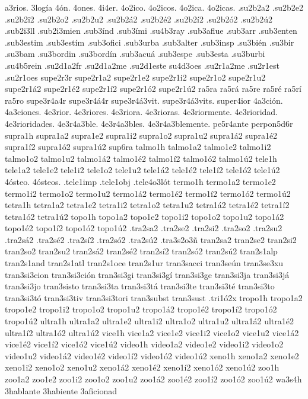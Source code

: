 {a3rios.
3logía
4ón.
4ones.
4i4er.
4o2ico.
4o2icos.
4o2ica.
4o2icas.
.su2b2a2
.su2b2e2
.su2b2i2
.su2b2o2
.su2b2u2
.su2b2á2
.su2b2é2
.su2b2í2
.su2b2ó2
.su2b2ú2
.sub2i3ll
.sub2i3mien
.sub3índ
.sub3ími
.su4b3ray
.sub3aflue
.sub3arr
.sub3enten
.sub3estim
.sub3estím
.sub3ofici
.sub3urba
.sub3alter
.sub3insp
.su3bién
.su3bir
.su3bam
.su3bordin
.su3bordín
.sub3acuá
.sub3espe
.sub3esta
.su3burbi
.su4b5rein
.su2d1a2fr
.su2d1a2me
.su2d1este
su4d3oes
.su2r1a2me
.su2r1est
.su2r1oes
supe2r3r
supe2r1a2 supe2r1e2 supe2r1i2 supe2r1o2 supe2r1u2
supe2r1á2 supe2r1é2 supe2r1í2 supe2r1ó2 supe2r1ú2
ra5ra
ra5rá
ra5re
ra5ré
ra5rí
ra5ro
supe3r4a4r
supe3r4á4r
supe3r4á3vit.
supe3r4á3vits.
super4ior
4a3ción.
4a3ciones.
4e3rior.
4e3riores.
4e3riora.
4e3rioras.
4e3riormente.
4e3rioridad.
4e3rioridades.
4e3r4a3ble.
4e3r4a3bles.
4e3r4a3blemente.
pe5r4ante
perpon5d6r
supra1h
supra1a2 supra1e2 supra1i2 supra1o2 supra1u2
supra1á2 supra1é2 supra1í2 supra1ó2 supra1ú2
sup6ra
talmo1h
talmo1a2 talmo1e2 talmo1i2 talmo1o2 talmo1u2
talmo1á2 talmo1é2 talmo1í2 talmo1ó2 talmo1ú2
tele1h
tele1a2 tele1e2 tele1i2 tele1o2 tele1u2
tele1á2 tele1é2 tele1í2 tele1ó2 tele1ú2
4ósteo.
4ósteos.
.tele1imp
.tele1obj
.tele4o3lót
termo1h
termo1a2 termo1e2 termo1i2 termo1o2 termo1u2
termo1á2 termo1é2 termo1í2 termo1ó2 termo1ú2
tetra1h
tetra1a2 tetra1e2 tetra1i2 tetra1o2 tetra1u2
tetra1á2 tetra1é2 tetra1í2 tetra1ó2 tetra1ú2
topo1h
topo1a2 topo1e2 topo1i2 topo1o2 topo1u2
topo1á2 topo1é2 topo1í2 topo1ó2 topo1ú2
.tra2sa2 .tra2se2 .tra2si2 .tra2so2 .tra2su2
.tra2sá2 .tra2sé2 .tra2sí2 .tra2só2 .tra2sú2
.tra3s2o3ñ
tran2sa2 tran2se2 tran2si2 tran2so2 tran2su2
tran2sá2 tran2sé2 tran2sí2 tran2só2 tran2sú2
tran2s1alp
tran2s1and
tran2s1atl
tran2s1oce
tran2s1ur
tran3sacci
tran3seún
tran3se3xu
tran3si3cion
tran3si3ción
tran3si3gi
tran3si3gí
tran3si3ge
tran3si3ja
tran3si3já
tran3si3jo
tran3sisto
tran3si3ta
tran3si3tá
tran3si3te
tran3si3té
tran3si3to
tran3si3tó
tran3si3tiv
tran3si3tori
tran3subst
tran3sust
.tri1ó2x
tropo1h
tropo1a2 tropo1e2 tropo1i2 tropo1o2 tropo1u2
tropo1á2 tropo1é2 tropo1í2 tropo1ó2 tropo1ú2
ultra1h
ultra1a2 ultra1e2 ultra1i2 ultra1o2 ultra1u2
ultra1á2 ultra1é2 ultra1í2 ultra1ó2 ultra1ú2
vice1h
vice1a2 vice1e2 vice1i2 vice1o2 vice1u2
vice1á2 vice1é2 vice1í2 vice1ó2 vice1ú2
video1h
video1a2 video1e2 video1i2 video1o2 video1u2
video1á2 video1é2 video1í2 video1ó2 video1ú2
xeno1h
xeno1a2 xeno1e2 xeno1i2 xeno1o2 xeno1u2
xeno1á2 xeno1é2 xeno1í2 xeno1ó2 xeno1ú2
zoo1h
zoo1a2 zoo1e2 zoo1i2 zoo1o2 zoo1u2
zoo1á2 zoo1é2 zoo1í2 zoo1ó2 zoo1ú2
wa3s4h
3hablante
3habiente
3aficionad
}
